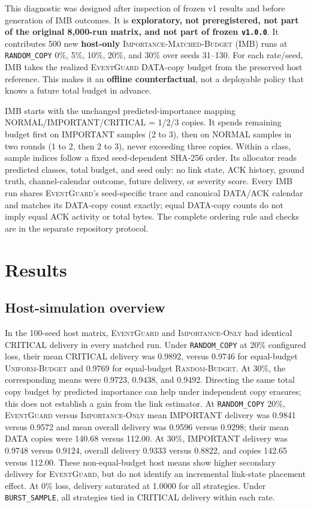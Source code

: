 \documentclass[11pt]{article}
\newcommand{\EG}{\textsc{EventGuard}}
\newcommand{\IO}{\textsc{Importance-Only}}
\newcommand{\UB}{\textsc{Uniform-Budget}}
\newcommand{\RB}{\textsc{Random-Budget}}
\begin{document}
This diagnostic was designed after inspection of frozen v1 results and before generation of IMB outcomes. It is \textbf{exploratory, not preregistered, not part of the original 8,000-run matrix, and not part of frozen \texttt{v1.0.0}}. It contributes 500 new \textbf{host-only} \textsc{Importance-Matched-Budget} (IMB) runs at \texttt{RANDOM\_COPY} 0\%, 5\%, 10\%, 20\%, and 30\% over seeds 31--130. For each rate/seed, IMB takes the realized \EG{} DATA-copy budget from the preserved host reference. This makes it an \textbf{offline counterfactual}, not a deployable policy that knows a future total budget in advance.

IMB starts with the unchanged predicted-importance mapping NORMAL/IMPORTANT/CRITICAL = 1/2/3 copies. It spends remaining budget first on IMPORTANT samples (2 to 3), then on NORMAL samples in two rounds (1 to 2, then 2 to 3), never exceeding three copies. Within a class, sample indices follow a fixed seed-dependent SHA-256 order. Its allocator reads predicted classes, total budget, and seed only: no link state, ACK history, ground truth, channel-calendar outcome, future delivery, or severity score. Every IMB run shares \EG{}'s seed-specific trace and canonical DATA/ACK calendar and matches its DATA-copy count exactly; equal DATA-copy counts do not imply equal ACK activity or total bytes. The complete ordering rule and checks are in the separate repository protocol.

\section{Results}\label{sec:results}

\subsection{Host-simulation overview}\label{sec:host-simulation-overview}

In the 100-seed host matrix, \EG{} and \IO{} had identical CRITICAL delivery in every matched run. Under \texttt{RANDOM\_COPY} at 20\% configured loss, their mean CRITICAL delivery was 0.9892, versus 0.9746 for equal-budget \UB{} and 0.9769 for equal-budget \RB{}. At 30\%, the corresponding means were 0.9723, 0.9438, and 0.9492. Directing the same total copy budget by predicted importance can help under independent copy erasures; this does not establish a gain from the link estimator. At \texttt{RANDOM\_COPY} 20\%, \EG{} versus \IO{} mean IMPORTANT delivery was 0.9841 versus 0.9572 and mean overall delivery was 0.9596 versus 0.9298; their mean DATA copies were 140.68 versus 112.00. At 30\%, IMPORTANT delivery was 0.9748 versus 0.9124, overall delivery 0.9333 versus 0.8822, and copies 142.65 versus 112.00. These non-equal-budget host means show higher secondary delivery for \EG{}, but do not identify an incremental link-state placement effect. At 0\% loss, delivery saturated at 1.0000 for all strategies. Under \texttt{BURST\_SAMPLE}, all strategies tied in CRITICAL delivery within each rate.
\end{document}
